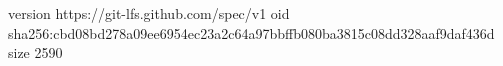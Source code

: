 version https://git-lfs.github.com/spec/v1
oid sha256:cbd08bd278a09ee6954ec23a2c64a97bbffb080ba3815c08dd328aaf9daf436d
size 2590
